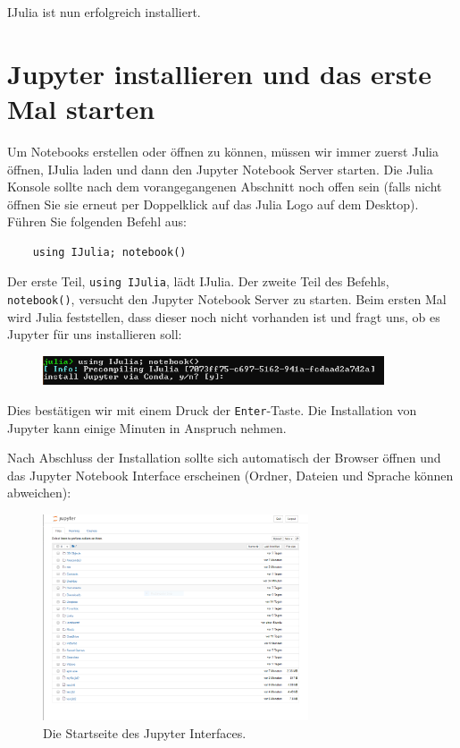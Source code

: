 \documentclass[11pt, a4paper]{scrartcl}
\begin{document}
	IJulia ist nun erfolgreich installiert.
	
	\section{Jupyter installieren und das erste Mal starten}
	
	Um Notebooks erstellen oder öffnen zu können, müssen wir immer zuerst Julia öffnen, IJulia laden und dann den Jupyter Notebook Server starten. Die Julia Konsole sollte nach dem vorangegangenen Abschnitt noch offen sein (falls nicht öffnen Sie sie erneut per Doppelklick auf das Julia Logo auf dem Desktop). Führen Sie folgenden Befehl aus:
	
	\begin{lstlisting}
	using IJulia; notebook()
	\end{lstlisting}
	
	Der erste Teil, \texttt{using IJulia}, lädt IJulia. Der zweite Teil des Befehls, \texttt{notebook()}, versucht den Jupyter Notebook Server zu starten. Beim ersten Mal wird Julia feststellen, dass dieser noch nicht vorhanden ist und fragt uns, ob es Jupyter für uns installieren soll:
	
	\begin{figure}[h!]
	\centering
	\includegraphics[width=0.9\textwidth]{imgs/Jupyter_install.png}
	\end{figure}
	
	Dies bestätigen wir mit einem Druck der \texttt{Enter}-Taste. Die Installation von Jupyter kann einige Minuten in Anspruch nehmen.
	
	Nach Abschluss der Installation sollte sich automatisch der Browser öffnen und das Jupyter Notebook Interface erscheinen (Ordner, Dateien und Sprache können abweichen):
	
	\begin{figure}[h!]
	\centering
	\includegraphics[width=0.7\textwidth]{imgs/jupyter.png}
	\caption{Die Startseite des Jupyter Interfaces. \label{fig:jupyter}}
	\end{figure}
	
\end{document}
